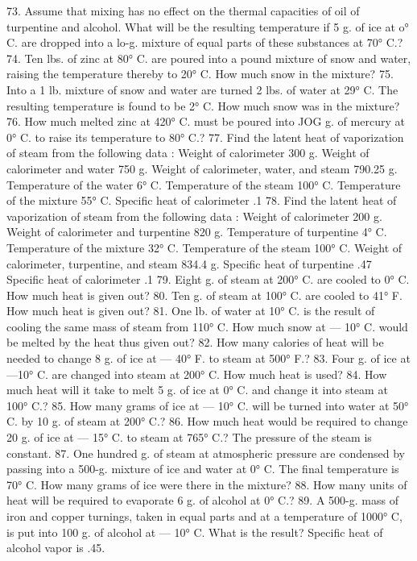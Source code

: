 73. Assume that mixing has no effect on the thermal capacities of oil of turpentine and alcohol. What will be the resulting temperature if 5 g. of ice at o° C. are dropped into a lo-g. mixture of equal parts of these substances at 70° C.?
74. Ten lbs. of zinc at 80° C. are poured into a pound mixture of snow and water, raising the temperature thereby to 20° C. How much snow in the mixture?
75. Into a 1 lb. mixture of snow and water are turned 2 lbs. of water at 29° C. The resulting temperature is found to be 2° C. How much snow was in the mixture?
76. How much melted zinc at 420° C. must be poured into JOG g. of mercury at 0° C. to raise its temperature to 80° C.?
77. Find the latent heat of vaporization of steam from the following data :
Weight of calorimeter 300 g.
Weight of calorimeter and water 750 g.
Weight of calorimeter, water, and steam 790.25 g.
Temperature of the water 6° C.
Temperature of the steam 100° C.
Temperature of the mixture 55° C.
Specific heat of calorimeter .1
78. Find the latent heat of vaporization of steam from the following data :
Weight of calorimeter 200 g.
Weight of calorimeter and turpentine 820 g.
Temperature of turpentine 4° C.
Temperature of the mixture 32° C.
Temperature of the steam 100° C.
Weight of calorimeter, turpentine, and steam 834.4 g.
Specific heat of turpentine .47
Specific heat of calorimeter .1
79. Eight g. of steam at 200° C. are cooled to 0° C. How much heat is given out?
80. Ten g. of steam at 100° C. are cooled to 41° F. How much heat is given out?
81. One lb. of water at 10° C. is the result of cooling the same mass of steam from 110° C. How much snow at — 10° C. would be melted by the heat thus given out?
82. How many calories of heat will be needed to change 8 g. of ice at — 40° F. to steam at 500° F.?
83. Four g. of ice at —10° C. are changed into steam at 200° C. How much heat is used?
84. How much heat will it take to melt 5 g. of ice at 0° C. and change it into steam at 100° C.?
85. How many grams of ice at — 10° C. will be turned into water at 50° C. by 10 g. of steam at 200° C.?
86. How much heat would be required to change 20 g. of ice at — 15° C. to steam at 765° C.? The pressure of the steam is constant.
87. One hundred g. of steam at atmospheric pressure are condensed by passing into a 500-g. mixture of ice and water at 0° C. The final temperature is 70° C. How many grams of ice were there in the mixture?
88. How many units of heat will be required to evaporate 6 g. of alcohol at 0° C.?
89. A 500-g. mass of iron and copper turnings, taken in equal parts and at a temperature of 1000° C, is put into 100 g. of alcohol at — 10° C. What is the result? Specific heat of alcohol vapor is .45.
